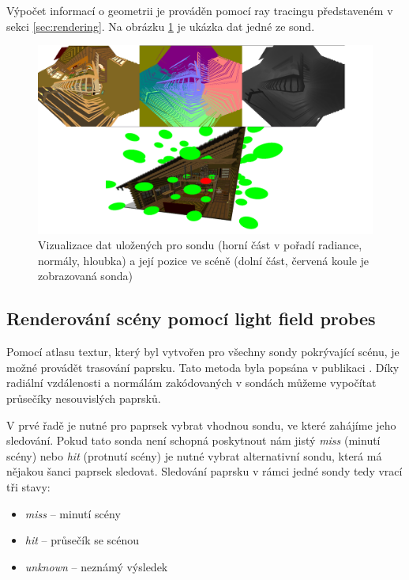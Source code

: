Výpočet informací o geometrii je prováděn pomocí ray tracingu představeném v sekci \ref{sec:rendering}. Na obrázku \ref{fig:probe_in_scene} je ukázka dat jedné ze sond.


\begin{figure}[H]
	\centering
	\includegraphics[scale=1]{images/probe_with_scene.png}
	\caption{Vizualizace dat uložených pro sondu (horní část v pořadí radiance, normály, hloubka) a její pozice ve scéně (dolní část, červená koule je zobrazovaná sonda)}
	\label{fig:probe_in_scene}
\end{figure}

\subsection{Renderování scény pomocí light field probes}
Pomocí atlasu textur, který byl vytvořen pro všechny sondy pokrývající scénu, je možné provádět trasování paprsku. Tato metoda byla popsána v publikaci \cite{light_field_probes}. Díky radiální vzdálenosti a normálám zakódovaných v sondách můžeme vypočítat průsečíky nesouvislých paprsků. 

V prvé řadě je nutné pro paprsek vybrat vhodnou sondu, ve které zahájíme jeho sledování. Pokud tato sonda není schopná poskytnout nám jistý \textit{miss} (minutí scény) nebo \textit{hit} (protnutí scény) je nutné vybrat alternativní sondu, která má nějakou šanci paprsek sledovat. Sledování paprsku v rámci jedné sondy tedy vrací tři stavy:
\begin{itemize}
    \item \textit{miss} -- minutí scény
    \item \textit{hit} -- průsečík se scénou
    \item \textit{unknown} -- neznámý výsledek
\end{itemize}


